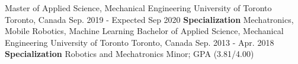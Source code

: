\begin{cventries}
  \cventry
    {Master of Applied Science, Mechanical Engineering}
    {University of Toronto}
    {Toronto, Canada}
    {Sep. 2019 - Expected Sep 2020}
    {\textbf{Specialization} Mechatronics, Mobile Robotics, Machine Learning}
  \cventry
    {Bachelor of Applied Science, Mechanical Engineering}
    {University of Toronto}
    {Toronto, Canada}
    {Sep. 2013 - Apr. 2018}
    {\textbf{Specialization} Robotics and Mechatronics Minor; GPA (3.81/4.00)}
\end{cventries}

